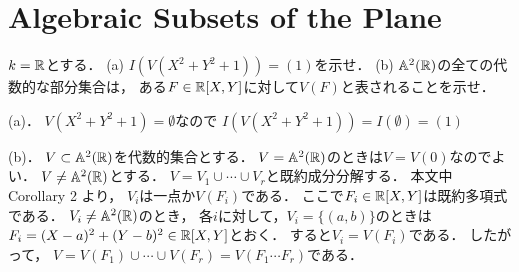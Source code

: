 \section{Algebraic Subsets of the Plane}

\begin{prob}
  $k=\mathbb{R}$とする．
  (a) $I(V(X^2+Y^2+1)) = (1)$を示せ．
  (b) $\mathbb{A}^2(\mathbb{R})$の全ての代数的な部分集合は，
  ある$F\in\mathbb{R}[X,Y]$に対して$V(F)$と表されることを示せ．
\end{prob}
\begin{ans}
  (a)．
  $V(X^2+Y^2+1) = \emptyset$なので
  $I(V(X^2+Y^2+1)) = I(\emptyset) = (1)$

  (b)．
  $V\subset \mathbb{A}^2(\mathbb{R})$を代数的集合とする．
  $V = \mathbb{A}^2(\mathbb{R})$のときは$V = V(0)$なのでよい．
  $V \ne \mathbb{A}^2(\mathbb{R})$とする．
  $V = V_1 \cup \cdots \cup V_r$と既約成分分解する．
  本文中 Corollary 2 より，
  $V_i$は一点か$V(F_i)$である．
  ここで$F_i \in \mathbb{R}[X,Y]$は既約多項式である．
  $V_i \ne \mathbb{A}^2(\mathbb{R})$のとき，
  各$i$に対して，$V_i = \{ (a,b) \}$のときは
  $F_i = (X-a)^2 + (Y-b)^2 \in \mathbb{R}[X,Y]$とおく．
  すると$V_i = V(F_i)$である．
  したがって，
  $V = V(F_1) \cup \cdots \cup V(F_r) = V( F_1 \cdots F_r )$である．
\end{ans}
